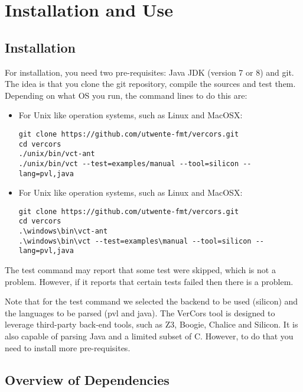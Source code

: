 \chapter{Installation and Use}


\section{Installation}

For installation, you need two pre-requisites: Java JDK (version 7 or 8) and git.
The idea is that you clone the git repository, compile the sources and test them.
Depending on what OS you run, the command lines to do this are:
\begin{itemize}
\item For Unix like operation systems, such as Linux and MacOSX:
\begin{verbatim}
git clone https://github.com/utwente-fmt/vercors.git
cd vercors
./unix/bin/vct-ant
./unix/bin/vct --test=examples/manual --tool=silicon --lang=pvl,java
\end{verbatim}
\item For Unix like operation systems, such as Linux and MacOSX:
\begin{verbatim}
git clone https://github.com/utwente-fmt/vercors.git
cd vercors
.\windows\bin\vct-ant
.\windows\bin\vct --test=examples\manual --tool=silicon --lang=pvl,java
\end{verbatim}
\end{itemize}

The test command may report that some test were skipped, which is not a problem.
However, if it reports that certain tests failed then there is a problem.

Note that for the test command we selected the backend to be used (silicon) and the languages to be parsed (pvl and java).
The VerCors tool is designed to leverage third-party back-end tools, such as Z3,
Boogie, Chalice and Silicon. It is also capable of parsing Java and a limited
subset of C. However, to do that you need to install more pre-requisites.

\section{Overview of Dependencies}

